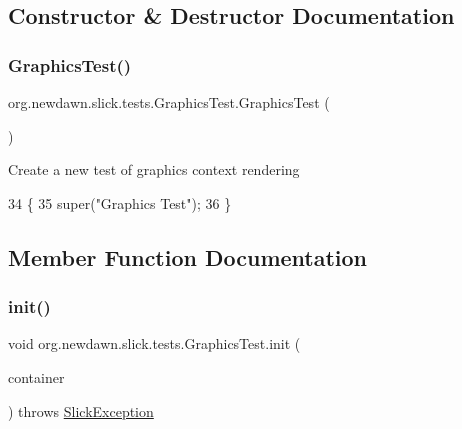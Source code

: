 \subsection{Constructor \& Destructor Documentation}
\mbox{\label{classorg_1_1newdawn_1_1slick_1_1tests_1_1_graphics_test_abb433e8bd2e5a754719a759827e94029}} 
\subsubsection{\texorpdfstring{Graphics\+Test()}{GraphicsTest()}}
{\footnotesize\ttfamily org.\+newdawn.\+slick.\+tests.\+Graphics\+Test.\+Graphics\+Test (\begin{DoxyParamCaption}{ }\end{DoxyParamCaption})\hspace{0.3cm}{\ttfamily [inline]}}

Create a new test of graphics context rendering 
\begin{DoxyCode}
34                           \{
35         super(\textcolor{stringliteral}{"Graphics Test"});
36     \}
\end{DoxyCode}


\subsection{Member Function Documentation}
\mbox{\label{classorg_1_1newdawn_1_1slick_1_1tests_1_1_graphics_test_abd7a7a26ad7740e3443fea07bbb2577c}} 
\subsubsection{\texorpdfstring{init()}{init()}}
{\footnotesize\ttfamily void org.\+newdawn.\+slick.\+tests.\+Graphics\+Test.\+init (\begin{DoxyParamCaption}\item[{\mbox{\hyperlink{classorg_1_1newdawn_1_1slick_1_1_game_container}{Game\+Container}}}]{container }\end{DoxyParamCaption}) throws \mbox{\hyperlink{classorg_1_1newdawn_1_1slick_1_1_slick_exception}{Slick\+Exception}}\hspace{0.3cm}{\ttfamily [inline]}}

